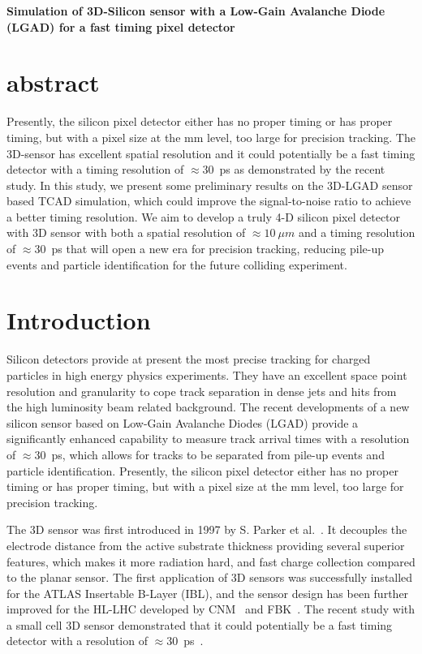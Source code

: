 \documentclass[aps,pt14,superscriptaddress,showpacs,floatfix,nofootinbib]{revtex4}
\begin{document}
\begin{center}
\large\bf{Simulation of 3D-Silicon sensor with a Low-Gain Avalanche Diode (LGAD) for a fast timing pixel detector}
\end{center}
\section{abstract}

Presently, the silicon
pixel detector either has no proper timing or has proper timing, but with a
pixel size at the mm level, too large for precision tracking.
The 3D-sensor has excellent spatial resolution and it could potentially be a fast timing detector with a timing
resolution of $\approx$30~ps as demonstrated by the recent study.
In this study, we present some preliminary results on the 3D-LGAD sensor based TCAD simulation, which
could improve the signal-to-noise ratio to achieve a better timing resolution.
We aim to develop a truly 4-D silicon pixel detector with 3D sensor with both a spatial
resolution of $\approx 10~\mu m$ and a timing resolution of $\approx$30~ps
that  will open a new era for precision tracking, reducing pile-up
events and particle identification for the future colliding experiment.

\section{Introduction}

Silicon detectors provide at present the most precise tracking for charged
particles in high energy physics experiments. They have an excellent space
point resolution and granularity to cope track separation in dense jets and
hits from the high luminosity beam related background.
The recent developments of a new silicon sensor based on Low-Gain Avalanche
Diodes (LGAD) provide a significantly enhanced capability to measure
track arrival times with a resolution of $\approx$30~ps, which allows for tracks to be 
separated from pile-up events and particle identification. Presently, the silicon
pixel detector either has no proper timing or has proper timing, but with a  
pixel size at the mm level, too large for precision tracking.

The 3D sensor was first introduced in 1997 by S. Parker et al.~\cite{Parker:1996dx}.
It decouples the electrode distance from the active substrate
thickness providing several superior features, which makes it more radiation hard,
and fast charge collection compared to the planar sensor.
The first application of 3D sensors was successfully installed for
the ATLAS Insertable B-Layer (IBL), and the sensor design has been
further improved for the HL-LHC developed by CNM~\cite{Pellegrini:2008zza}
and FBK~\cite{Sultan:2016vzg}.
The recent study with a small cell 3D sensor demonstrated that it
could potentially be a fast timing detector with a resolution
of $\approx$30~ps~\cite{Kramberger:2019ygz}.
\end{document}
